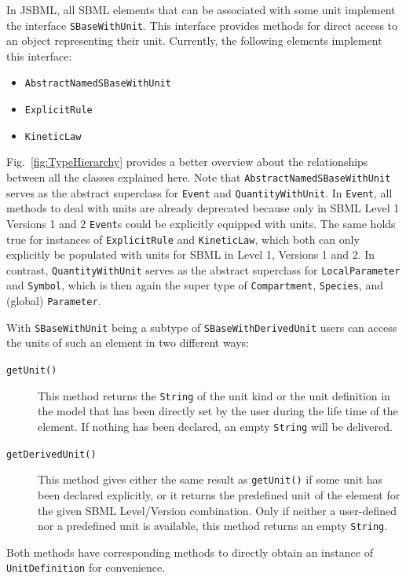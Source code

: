 \documentclass[
  BCOR12mm,
  letterpaper,
  11pt,
  headsepline,
  pointlessnumbers,
  tablecaptionabove,
  onelinecaption,
  headinclude,
  appendixprefix,
  idxtotoc,
  bibtotoc,
  twoside,
  titlepage
]{scrartcl}
\begin{document}
In JSBML, all SBML elements that can be associated with some unit implement the
interface \texttt{SBaseWithUnit}. This interface provides methods for direct
access to an object representing their unit. Currently, the following elements
implement this interface:
\begin{itemize}
 \item \texttt{AbstractNamedSBaseWithUnit}
 \item \texttt{ExplicitRule}
 \item \texttt{KineticLaw}
\end{itemize}
Fig.~\vref{fig:TypeHierarchy} provides a better overview about the relationships
between all the classes explained here. Note that
\texttt{AbstractNamedSBaseWithUnit} serves as the abstract superclass for
\texttt{Event} and \texttt{QuantityWithUnit}. In \texttt{Event}, all methods
to deal with units are already deprecated because only in SBML Level 1 Versions
1 and 2 \citep{Hucka2003} \texttt{Event}s could be
explicitly equipped with units. The same holds true for instances of
\texttt{ExplicitRule}
and \texttt{KineticLaw},
which both can only explicitly be populated with units for
SBML in Level 1, Versions 1 and 2. In contrast, \texttt{QuantityWithUnit} serves
as the abstract superclass for \texttt{LocalParameter} and \texttt{Symbol},
which is then again the super type of \texttt{Compartment}, \texttt{Species}, and (global) \texttt{Parameter}.

With \texttt{SBaseWithUnit} being a subtype of \texttt{SBaseWithDerivedUnit}
users can access the units of such an element in two different ways:
\begin{description}
 \item[\texttt{getUnit()}] This method returns the \texttt{String} of the unit
 kind or the unit definition in the model
 that has been directly set by the user
 during the life time of the element. If nothing has been declared, an empty
 \texttt{String} will be delivered.
 \item[\texttt{getDerivedUnit()}] This method gives either the same result as
 \texttt{getUnit()} if some unit has been declared explicitly, or it returns the
 predefined unit of the element for the given SBML Level/Version combination.
 Only if neither a user-defined nor a predefined unit is available, this method
 returns an empty \texttt{String}.
\end{description}
Both methods have corresponding methods to directly obtain an instance of
\texttt{UnitDefinition}
for convenience.
\end{document}

